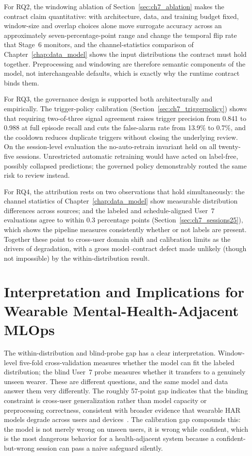 For RQ2, the windowing ablation of Section~\ref{sec:ch7_ablation} makes the contract claim quantitative: with architecture, data, and training budget fixed, window-size and overlap choices alone move surrogate accuracy across an approximately seven-percentage-point range and change the temporal flip rate that Stage~6 monitors, and the channel-statistics comparison of Chapter~\ref{chap:data_model} shows the input distributions the contract must hold together. Preprocessing and windowing are therefore semantic components of the model, not interchangeable defaults, which is exactly why the runtime contract binds them.

For RQ3, the governance design is supported both architecturally and empirically. The trigger-policy calibration (Section~\ref{sec:ch7_triggerpolicy}) shows that requiring two-of-three signal agreement raises trigger precision from 0.841 to 0.988 at full episode recall and cuts the false-alarm rate from 13.9\% to 0.7\%, and the cooldown reduces duplicate triggers without closing the underlying review. On the session-level evaluation the no-auto-retrain invariant held on all twenty-five sessions. Unrestricted automatic retraining would have acted on label-free, possibly collapsed predictions; the governed policy demonstrably routed the same risk to review instead.

For RQ4, the attribution rests on two observations that hold simultaneously: the channel statistics of Chapter~\ref{chap:data_model} show measurable distribution differences across sources; and the labeled and schedule-aligned User~7 evaluations agree to within 0.3 percentage points (Section~\ref{sec:ch7_sessions25}), which shows the pipeline measures consistently whether or not labels are present. Together these point to cross-user domain shift and calibration limits as the drivers of degradation, with a gross model--contract defect made unlikely (though not impossible) by the within-distribution result.

\section{Interpretation and Implications for Wearable Mental-Health-Adjacent MLOps}
\label{sec:ch8_interpretation}

The within-distribution and blind-probe gap has a clear interpretation. Window-level five-fold cross-validation measures whether the model can fit the labeled distribution; the blind User~7 probe measures whether it transfers to a genuinely unseen wearer. These are different questions, and the same model and data answer them very differently. The roughly 57-point gap indicates that the binding constraint is cross-user generalization rather than model capacity or preprocessing correctness, consistent with broader evidence that wearable HAR models degrade across users and devices~\cite{stisen2015smart,wang2024enhancing,dhekane2024transfer}. The calibration gap compounds this: the model is not merely wrong on unseen users, it is wrong while confident, which is the most dangerous behavior for a health-adjacent system because a confident-but-wrong session can pass a naive safeguard silently.

